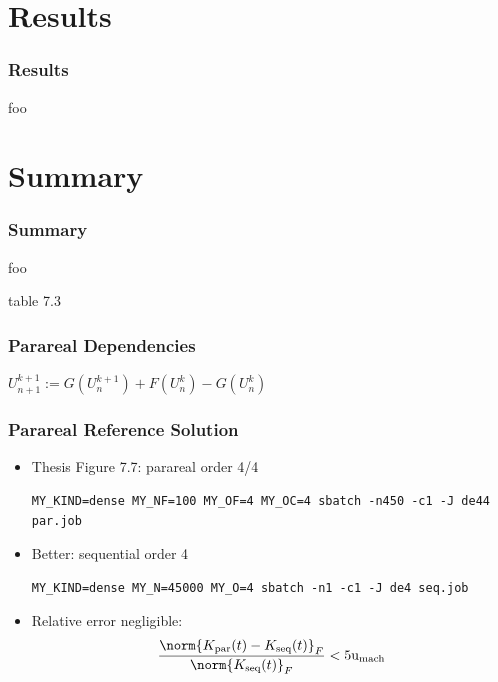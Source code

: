 \documentclass[
  aspectratio=1610,
]{beamer}
\begin{document}
\section{Results}

\begin{frame}
  \frametitle{Results}
  foo
\end{frame}

\section{Summary}

\begin{frame}
  \frametitle{Summary}
  foo
\end{frame}

\appendix

\begin{frame}
  table 7.3
\end{frame}

\begin{frame}
  \frametitle{Parareal Dependencies}
  $
    U^{k+1}_{n+1} := G(U^{k+1}_n) + F(U^k_n) - G(U^k_n)
  $
  \vfill
  
\end{frame}

\renewcommand\mathrm\mathsf %
\newcommand\sidenote[1]{\footnotesize{\textcolor{gray}{#1}}}

\begin{frame}[fragile]
  \frametitle{Parareal Reference Solution}
  \begin{itemize}
    \item
      Thesis Figure 7.7: parareal order 4/4

      \begin{lstlisting}
MY_KIND=dense MY_NF=100 MY_OF=4 MY_OC=4 sbatch -n450 -c1 -J de44 par.job
      \end{lstlisting}
    \item
      Better: sequential order 4

      \begin{lstlisting}
MY_KIND=dense MY_N=45000 MY_O=4 sbatch -n1 -c1 -J de4 seq.job
      \end{lstlisting}
    \item
      Relative error negligible:
      \begin{equation*}
        \frac{\norm{K_\text{par}(t) - K_\text{seq}(t)}_F}{\norm{K_\text{seq}(t)}_F}
        < 5\umach
      \end{equation*}
  \end{itemize}
\end{frame}
\end{document}
